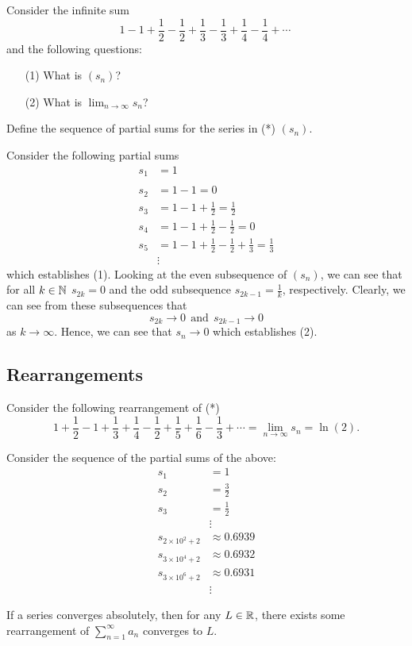 \documentclass[a4paper]{article}
\begin{document}
Consider the infinite sum
\[  1 - 1 + \frac{ 1 }{ 2 }  - \frac{ 1 }{ 2 }  + \frac{ 1 }{ 3 }  - \frac{ 1 }{ 3 }  + \frac{ 1 }{ 4 }  - \frac{ 1 }{ 4 }  + \cdots \   \tag{*}\]
and the following questions:
\begin{enumerate}
    \item[(1)] What is \( ({s}_{n}) \)?
    \item[(2)] What is \( \lim_{ n \to \infty  }  {s}_{n} \)?
\end{enumerate}
Define the sequence of partial sums for the series in (*) \( ({s}_{n}) \).

Consider the following partial sums 
\begin{align*}
    {s}_{1} &= 1 \\ \\
    {s}_{2} &= 1 - 1 = 0 \\
    {s}_{3} &= 1 - 1 + \frac{ 1 }{ 2 }  = \frac{ 1 }{ 2 }  \\
    {s}_{4} &= 1 - 1 + \frac{ 1 }{ 2 }  - \frac{ 1 }{ 2 } = 0  \\
    {s}_{5} &= 1 - 1 + \frac{ 1 }{ 2 }  - \frac{ 1 }{ 2 }  + \frac{ 1 }{ 3 }  = \frac{ 1 }{ 3 }  \\
            &\vdots 
\end{align*}
which establishes (1). Looking at the even subsequence of \( ({s}_{n}) \), we can see that for all \( k \in \mathbb{N}  \) \( {s}_{2k} = 0 \) and the odd subsequence \( {s}_{2k-1} = \frac{ 1 }{ k }  \), respectively. Clearly, we can see from these subsequences that  
\[  {s}_{2k} \to 0 \ \ \text{and} \ \ {s}_{2k-1} \to 0 \]
as \( k \to \infty  \). Hence, we can see that \( {s}_{n} \to 0  \) which establishes (2). 

\subsection{Rearrangements}

Consider the following rearrangement of (*)
\[  1 + \frac{ 1 }{ 2 }  - 1 + \frac{ 1 }{ 3 } + \frac{ 1 }{ 4 }  - \frac{ 1 }{ 2 }  + \frac{ 1 }{ 5 }  + \frac{ 1 }{ 6 }  - \frac{ 1 }{ 3 }  + \cdots = \lim_{ n \to \infty   } {s}_{n} = \ln (2).  \]

Consider the sequence of the partial sums of the above: 
\begin{align*}
    {s}_{1} &= 1  \\
    {s}_{2} &= \frac{ 3 }{ 2 }  \\
    {s}_{3} &= \frac{ 1 }{ 2 }  \\
            &\vdots \\
    {s}_{2 \times 10^{2} + 2} &\approx 0.6939 \\
    {s}_{3 \times 10^{4} + 2} &\approx 0.6932 \\
    {s}_{3 \times 10^{6} + 2} &\approx 0.6931 \\
            &\vdots 
\end{align*} 

\begin{theorem}[ ]
    If a series converges absolutely, then for any \( L \in \mathbb{R}  \), there exists some rearrangement of \( \sum_{ n=1  }^{ \infty  } {a}_{n} \) converges to \( L  \).
\end{theorem}
\end{document}
